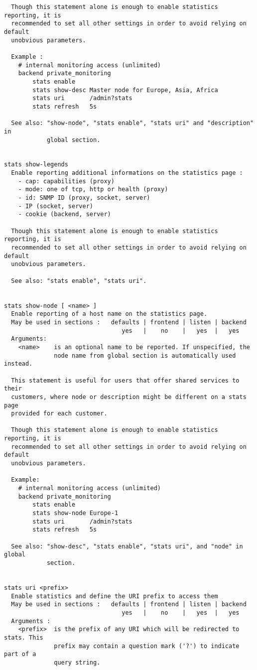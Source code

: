 \begin{verbatim}
  Though this statement alone is enough to enable statistics reporting, it is
  recommended to set all other settings in order to avoid relying on default
  unobvious parameters.

  Example :
    # internal monitoring access (unlimited)
    backend private_monitoring
        stats enable
        stats show-desc Master node for Europe, Asia, Africa
        stats uri       /admin?stats
        stats refresh   5s

  See also: "show-node", "stats enable", "stats uri" and "description" in
            global section.


stats show-legends
  Enable reporting additional informations on the statistics page :
    - cap: capabilities (proxy)
    - mode: one of tcp, http or health (proxy)
    - id: SNMP ID (proxy, socket, server)
    - IP (socket, server)
    - cookie (backend, server)

  Though this statement alone is enough to enable statistics reporting, it is
  recommended to set all other settings in order to avoid relying on default
  unobvious parameters.

  See also: "stats enable", "stats uri".


stats show-node [ <name> ]
  Enable reporting of a host name on the statistics page.
  May be used in sections :   defaults | frontend | listen | backend
                                 yes   |    no    |   yes  |   yes
  Arguments:
    <name>    is an optional name to be reported. If unspecified, the
              node name from global section is automatically used instead.

  This statement is useful for users that offer shared services to their
  customers, where node or description might be different on a stats page
  provided for each customer.

  Though this statement alone is enough to enable statistics reporting, it is
  recommended to set all other settings in order to avoid relying on default
  unobvious parameters.

  Example:
    # internal monitoring access (unlimited)
    backend private_monitoring
        stats enable
        stats show-node Europe-1
        stats uri       /admin?stats
        stats refresh   5s

  See also: "show-desc", "stats enable", "stats uri", and "node" in global
            section.


stats uri <prefix>
  Enable statistics and define the URI prefix to access them
  May be used in sections :   defaults | frontend | listen | backend
                                 yes   |    no    |   yes  |   yes
  Arguments :
    <prefix>  is the prefix of any URI which will be redirected to stats. This
              prefix may contain a question mark ('?') to indicate part of a
              query string.


\end{verbatim}
